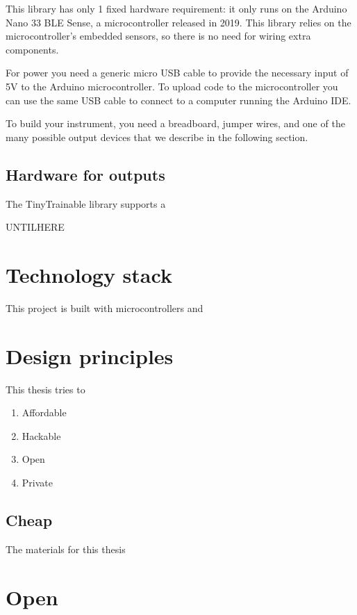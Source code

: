 This library has only 1 fixed hardware requirement: it only runs on the Arduino Nano 33 BLE Sense, a microcontroller released in 2019. This library relies on the microcontroller's embedded sensors, so there is no need for wiring extra components.

For power you need a generic micro USB cable to provide the necessary input of 5V to the Arduino microcontroller. To upload code to the microcontroller you can use the same USB cable to connect to a computer running the Arduino IDE.

To build your instrument, you need a breadboard, jumper wires, and one of the many possible output devices that we describe in the following section.

\subsection{Hardware for outputs}

The TinyTrainable library supports a 

UNTILHERE

\section{Technology stack}

This project is built with microcontrollers and 

\section{Design principles}

This thesis tries to 

\begin{enumerate}
  \item Affordable
  \item Hackable
  \item Open
  \item Private
\end{enumerate}

\subsection{Cheap}

The materials for this thesis 


\section{Open}

